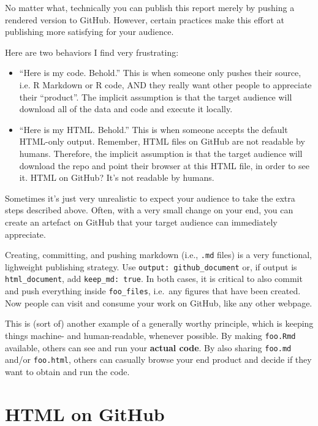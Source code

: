 \documentclass[
]{book}
\providecommand{\tightlist}{%
  \setlength{\itemsep}{0pt}\setlength{\parskip}{0pt}}
\begin{document}
No matter what, technically you can publish this report merely by pushing a rendered version to GitHub.
However, certain practices make this effort at publishing more satisfying for your audience.

Here are two behaviors I find very frustrating:

\begin{itemize}
\tightlist
\item
  ``Here is my code. Behold.'' This is when someone only pushes their source, i.e.
  R Markdown or R code, AND they really want other people to appreciate their
  ``product''. The implicit assumption is that the target audience will download
  all of the data and code and execute it locally.
\item
  ``Here is my HTML. Behold.'' This is when someone accepts the default HTML-only
  output. Remember, HTML files on GitHub are not readable by humans. Therefore,
  the implicit assumption is that the target audience will download the repo
  and point their browser at this HTML file, in order to see it.
  HTML on GitHub? It's not readable by humans.
\end{itemize}

Sometimes it's just very unrealistic to expect your audience to take the extra steps described above.
Often, with a very small change on your end, you can create an artefact on GitHub that your target audience can immediately appreciate.

Creating, committing, and pushing markdown (i.e., \texttt{.md} files) is a very functional, lighweight publishing strategy.
Use \texttt{output:\ github\_document} or, if output is \texttt{html\_document}, add \texttt{keep\_md:\ true}.
In both cases, it is critical to also commit and push everything inside \texttt{foo\_files}, i.e.~any figures that have been created.
Now people can visit and consume your work on GitHub, like any other webpage.

This is (sort of) another example of a generally worthy principle, which is keeping things machine- and human-readable, whenever possible.
By making \texttt{foo.Rmd} available, others can see and run your \textbf{actual code}.
By also sharing \texttt{foo.md} and/or \texttt{foo.html}, others can casually browse your end product and decide if they want to obtain and run the code.

\section{HTML on GitHub}\label{html-on-github}
\end{document}
